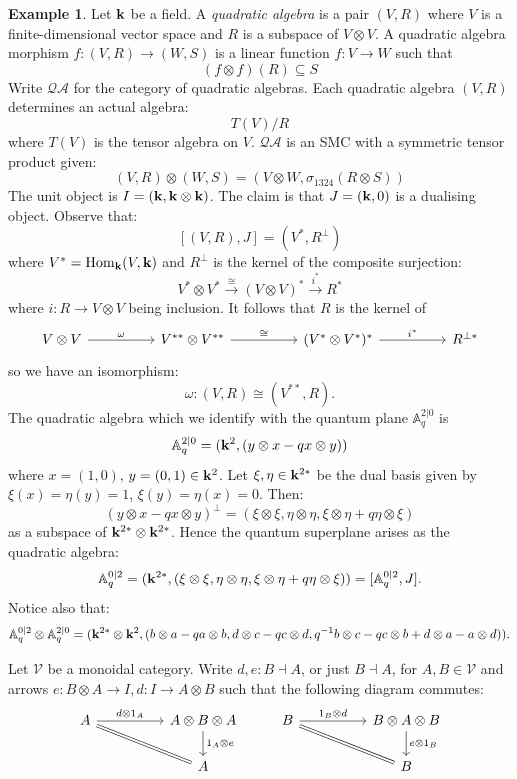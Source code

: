 \documentclass[8pt]{article}
\theoremstyle{definition}
\theoremstyle{definition}
\theoremstyle{definition}
\theoremstyle{definition}
\theoremstyle{definition}
\theoremstyle{definition}
\theoremstyle{definition}
\theoremstyle{definition}
\theoremstyle{definition}
\theoremstyle{definition}
\theoremstyle{definition}
\theoremstyle{definition}
\newtheorem{example}{Example}[section]
\theoremstyle{definition}
\theoremstyle{definition}
\theoremstyle{question}
\begin{document}
\begin{example}
  Let ${\bf k}$ be a field. A \emph{quadratic algebra} is a pair $(V, R)$ where $V$ is a finite-dimensional vector space and $R$ is a subspace of $V \otimes V$. 
  A quadratic algebra morphism $f : (V, R) \to (W, S)$ is a linear function $f : V \to W$ such that
  \[
  (f \otimes f)(R) \subseteq S
  \]
  Write $\mathcal{Q}\mathcal{A}$ for the category of quadratic algebras. Each quadratic algebra $(V, R)$ determines an actual algebra:
  \[
  T(V)/R
  \]
  where $T(V)$ is the tensor algebra on $V$. $\mathcal{Q}\mathcal{A}$ is an SMC with a symmetric tensor product given:
  \[
  (V, R) \otimes (W, S) = (V \otimes W, \sigma_{1324}(R \otimes S))
  \]
  The unit object is $I = ({\bf k}, {\bf k} \otimes {\bf k})$.
  The claim is that $J = ({\bf k}, 0)$ is a dualising object. Observe that:
  \[
  [(V, R), J] = (V^*, R^{\bot})
  \]
  where $V^* = \operatorname{Hom}_{\bf k}(V, {\bf k})$ and $R^{\bot}$ is the kernel of the composite surjection:
  \[
  V^* \otimes V^* \xrightarrow{\cong} (V \otimes V)^* \xrightarrow{i^*} R^*
  \]
  where $i : R \to V \otimes V$ being inclusion. It follows that $R$ is the kernel of
  \[
  \begin{tikzcd}
    V \otimes V \ar[rr, "\omega"]  &&V^{**} \otimes V^{**} \ar[rr, "\cong"] && (V^{*} \otimes V^{*})^{*} \ar[rr, "i^*"] && R^{\bot *}
  \end{tikzcd}
  \]
  so we have an isomorphism:
  \[
  \omega : (V, R) \cong (V^{**}, R).
  \]
  The quadratic algebra which we identify with the quantum plane $\mathbb{A}^{2|0}_q$ is
  \[
  \mathbb{A}^{2|0}_q = ({\bf k}^2, (y \otimes x - q x \otimes y))
  \]
  where $x = (1, 0)$, $y = (0, 1) \in {\bf k}^2$. Let $\xi, \eta \in {\bf k}^{2*}$ be the dual basis given by $\xi(x) = \eta(y) = 1$, $\xi(y) = \eta(x) = 0$. Then:
  \[
  (y \otimes x - q x \otimes y)^{\bot} = (\xi \otimes \xi, \eta \otimes \eta, \xi \otimes \eta + q \eta \otimes \xi)
  \]
  as a subspace of ${\bf k}^{2*} \otimes {\bf k}^{2*}$. Hence the quantum superplane arises as the quadratic algebra:
  \[
  \mathbb{A}^{0|2}_q = ({\bf k}^{2*}, (\xi \otimes \xi, \eta \otimes \eta, \xi \otimes \eta + q \eta \otimes \xi)) = [\mathbb{A}^{0|2}_q, J].
  \]
  Notice also that:
  \[
  \mathbb{A}^{0|2}_q \otimes \mathbb{A}^{2|0}_q = ({\bf k}^{2*} \otimes {\bf k}^2, (b \otimes a - q a \otimes b, d \otimes c - q c \otimes d, q^{-1} b \otimes c - q c \otimes b + d \otimes a - a \otimes d)).
  \]
\end{example}

  Let $\mathcal{V}$ be a monoidal category. Write $d, e : B \dashv A$, or just $B \dashv A$, for $A, B \in \mathcal{V}$ and arrows $e : B \otimes A \to I, d : I \to A \otimes B$
  such that the following diagram commutes:
  \[
  \begin{tikzcd}
    A \ar[rr, "d \otimes 1_A"] \ar[drr, equal] && A \otimes B \otimes A \ar[d, "1_A \otimes e"] & B \ar[drr, equal] \ar[rr, "1_B \otimes d"] && B \otimes A \otimes B \ar[d, "e \otimes 1_B"] \\
    && A &&& B 
  \end{tikzcd}
  \]
\end{document}
